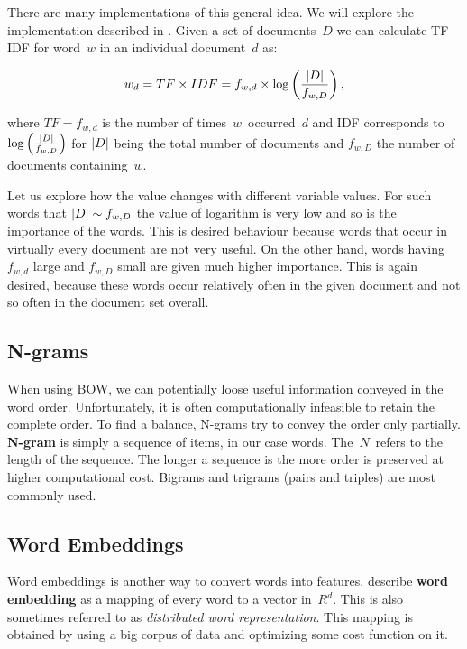 There are many implementations of this general idea.
We will explore the implementation described in \citet{Ramos03}.
Given a set of documents~$D$
we can calculate TF-IDF for word~$w$ in an individual document~$d$ as:

\[
	w_d = TF \times IDF = f_{w, d} \times \log \left( \frac{\left|{D}\right|}{f_{w,D}}  \right),
\]

where $TF = f_{w, d}$ is the number of times~$w$~occurred~$d$ and
IDF corresponds to $\log \left( \frac{\left|{D}\right|}{f_{w,D}}  \right)$ for $\left|{D}\right|$ being the total number of documents and $f_{w, D}$ the number of documents containing~$w$.

Let us explore how the value changes with different variable values.
For such words that $\left|{D}\right| \sim f_{w, D}$ the value of logarithm is very low and so is the importance of the words.
This is desired behaviour because words that occur in virtually every document  are not very useful.
On the other hand, words having $f_{w,d}$ large and $f_{w,D}$ small are given much higher importance.
This is again desired, because these words occur relatively often in the given document and not so often in the document set overall.


\subsection{N-grams}

When using BOW, we can potentially loose useful information conveyed in the word order.
Unfortunately, it is often computationally infeasible to retain the complete order.
To find a balance, N-grams try to convey the order only partially.
\textbf{N-gram} is simply a sequence of items, in our case words. The~$N$~refers to the length of the sequence.
The longer a sequence is the more order is preserved at higher computational cost.
Bigrams and trigrams (pairs and triples) are most commonly used.


\subsection{Word Embeddings}
\label{subsec:wordembed}

Word embeddings is another way to convert words into features.
\citet{LeGo14} describe {\bf word embedding} as a mapping of every word to a vector in~$R^d$.
This is also sometimes referred to as \textit{distributed word representation}.
This mapping is obtained by using a big corpus of data and optimizing some cost function on it.

